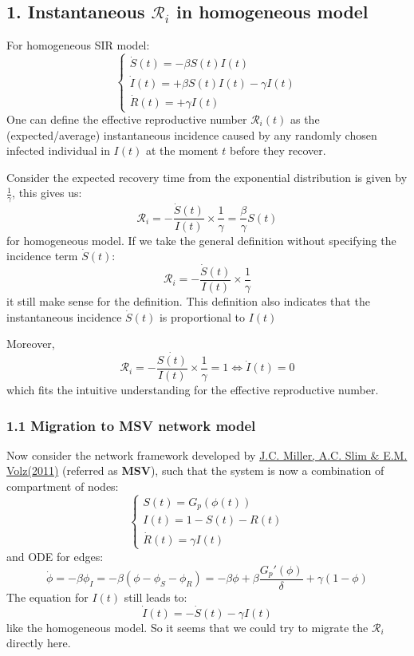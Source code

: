 \documentclass[
]{article}
\author{}
\date{}
\begin{document}
\subsection{\texorpdfstring{1. Instantaneous \(\mathcal{R}_{i}\) in
homogeneous
model}{1. Instantaneous \textbackslash mathcal\{R\}\_\{i\} in homogeneous model}}\label{instantaneous-mathcalr_i-in-homogeneous-model}

For homogeneous SIR model: \[\begin{cases}
    \dot{S}(t)=-\beta S(t)I(t)
    \\
    \dot{I}(t)=+\beta S(t) I(t)-\gamma I(t)
    \\
    \dot{R}(t)=+\gamma I(t)
\end{cases}\] One can define the effective reproductive number
\(\mathcal{R}_{i}(t)\) as the (expected/average) instantaneous incidence
caused by any randomly chosen infected individual in \(I(t)\) at the
moment \(t\) before they recover.

Consider the expected recovery time from the exponential distribution is
given by \(\frac{1}{\gamma}\), this gives us:
\[\mathcal{R}_{i}=-\frac{\dot{S}(t)}{I(t)} \times\frac{1}{\gamma}=\frac{\beta}{\gamma}S(t)\]
for homogeneous model. If we take the general definition without
specifying the incidence term \(\dot{S}(t)\):
\[\mathcal{R}_{i}=-\frac{\dot{S}(t)}{I(t)} \times\frac{1}{\gamma}\]it
still make sense for the definition. This definition also indicates that
the instantaneous incidence \(\dot{S}(t)\) is proportional to \(I(t)\)

Moreover,
\[\mathcal{R}_{i}=-\frac{\dot{S(t)}}{I(t)} \times\frac{1}{\gamma}=1 \Leftrightarrow \dot{I}(t)=0\]
which fits the intuitive understanding for the effective reproductive
number.

\subsubsection{1.1 Migration to MSV network
model}\label{migration-to-msv-network-model}

Now consider the network framework developed by
\href{./refs/MillerSlimVolz2011.pdf}{J.C. Miller, A.C. Slim \& E.M.
Volz(2011)} (referred as \textbf{MSV}), such that the system is now a
combination of compartment of nodes: \[\begin{cases}
    S(t)=G_p(\phi(t))
    \\
    I(t)=1-S(t)-R(t)
    \\
    \dot{R}(t)=\gamma I(t)
\end{cases}\] and ODE for edges:
\[\dot{\phi}=-\beta\phi_I=-\beta(\phi-\phi_S-\phi_R)=-\beta\phi+\beta\frac{G_p'(\phi)}{\delta}+\gamma(1-\phi)\]
The equation for \(I(t)\) still leads to:
\[\dot{I}(t)=-\dot{S}(t)-\gamma I(t)\] like the homogeneous model. So it
seems that we could try to migrate the \(\mathcal{R}_{i}\) directly
here.
\end{document}
